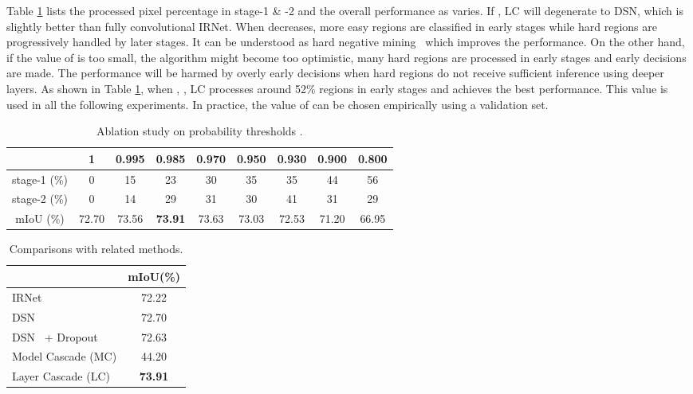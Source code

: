 \documentclass[10pt,twocolumn,letterpaper]{article}
\begin{document}
Table \ref{tab:ablation_threshold} lists the processed pixel percentage in stage-1 \& -2 and the overall performance as  varies.
If , LC will degenerate to DSN, which is slightly better than fully convolutional IRNet.
When  decreases, more easy regions are classified in early stages while hard regions are progressively handled by later stages.
It can be understood as hard negative mining~\cite{girshick2014rich, shrivastava2016training} which improves the performance.
On the other hand, if the value of  is too small, the algorithm might become too optimistic, \ie many hard regions are processed in early stages and early decisions are made.
The performance will be harmed by overly early decisions when hard regions do not receive sufficient inference using deeper layers.
As shown in Table \ref{tab:ablation_threshold}, when , \ie, LC processes around 52\% regions in early stages and achieves the best performance. This value is used in all the following experiments.
In practice, the value of  can be chosen empirically using a validation set.



\begin{table}
    \small
\caption{Ablation study on probability thresholds .}
    \centering
    \begin{tabular}{@{}c@{ \,}|@{\,}c@{ \,}|@{\,}c@{ \,}|@{\,}c@{ \,}|@{\,}c@{ \,}|@{\,}c@{ \,}|@{\,}c@{ \,}|@{\,}c@{ \,}|@{\,}c@{ \,}}
        \hline
         & 1&0.995&0.985&0.970&0.950&0.930&0.900&0.800\\
        \hline\hline
        stage-1 (\%) & 0& 15&  23& 30& 35& 35& 44& 56\\
        stage-2 (\%) & 0& 14&  29& 31& 30& 41& 31& 29\\
        \hline
        mIoU (\%) &72.70&73.56& \textbf{73.91} & 73.63& 73.03&72.53&71.20&66.95\\
        \hline
    \end{tabular}
    \label{tab:ablation_threshold}
\end{table}

\begin{table}
    \small
    \caption{Comparisons with related methods.}
    \centering
    \begin{tabular}{l|c}
        \hline
        &mIoU(\%)\\
        \hline\hline
        IRNet~\cite{szegedy2016inception} & 72.22\\ 
        DSN~\cite{lee2015deeply} &72.70\\  
        DSN~\cite{lee2015deeply} + Dropout~\cite{srivastava2014dropout} & 72.63\\  
        Model Cascade (MC) & 44.20\\ 
        \hline\hline
        Layer Cascade (LC) & \textbf{73.91} \\
        \hline
    \end{tabular}
    \label{tab:related_methods}
\end{table}
\end{document}
